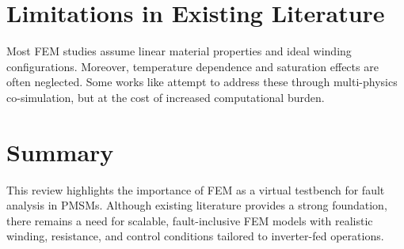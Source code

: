 \section{Limitations in Existing Literature}
Most FEM studies assume linear material properties and ideal winding configurations. Moreover, temperature dependence and saturation effects are often neglected. Some works like \cite{Patel2020} attempt to address these through multi-physics co-simulation, but at the cost of increased computational burden.

\section{Summary}
This review highlights the importance of FEM as a virtual testbench for fault analysis in PMSMs. Although existing literature provides a strong foundation, there remains a need for scalable, fault-inclusive FEM models with realistic winding, resistance, and control conditions tailored to inverter-fed operations.

